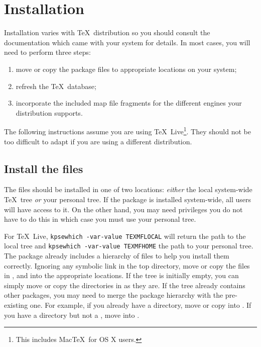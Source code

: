 \documentclass[11pt,british]{article}
\begin{document}
\section{Installation}

Installation varies with \TeX\ distribution so you should consult the documentation which came with your system for details. In most cases, you will need to perform three steps:
		\begin{enumerate}
			\item move or copy the package files to appropriate locations on your system;
			\item refresh the \TeX\ database;
			\item incorporate the included map file fragments for the different engines your distribution supports.
		\end{enumerate}

The following instructions assume you are using \TeX~Live\footnote{This includes Mac\TeX\ for OS X users.}. They should not be too difficult to adapt if you are using a different distribution.

\subsection{Install the files}

The files should be installed in one of two locations: \emph{either} the local system-wide \TeX\ tree \emph{or} your personal tree. If the package is installed system-wide, all users will have access to it. On the other hand, you may need privileges you do not have to do this in which case you must use your personal tree.

For \TeX~Live, \verb|kpsewhich -var-value TEXMFLOCAL| will return the path to the local tree and \verb|kpsewhich -var-value TEXMFHOME| the path to your personal tree. The package already includes a hierarchy of files to help you install them correctly. Ignoring any symbolic link in the top directory, move or copy the files in ,  and  into the appropriate locations. If the tree is initially empty, you can simply move or copy the directories in as they are. If the tree already contains other packages, you may need to merge the package hierarchy with the pre-existing one. For example, if you already have a  directory, move or copy  into . If you have a  directory but not a , move  into .
\end{document}
